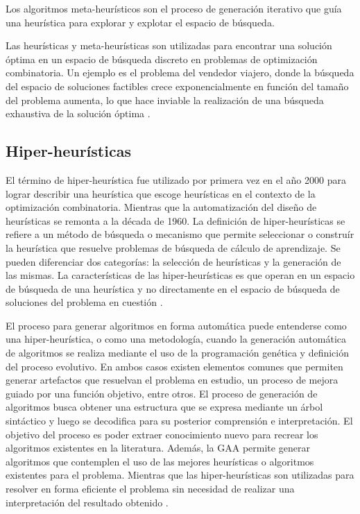 Los algoritmos meta-heurísticos son el proceso de generación iterativo que guía una heurística para explorar y explotar el espacio de búsqueda.

Las heurísticas y meta-heurísticas son utilizadas para encontrar una solución óptima en un espacio de búsqueda discreto en problemas de optimización combinatoria. Un ejemplo es el problema del vendedor viajero, donde la búsqueda del espacio de soluciones factibles crece exponencialmente en función del tamaño del problema aumenta, lo que hace inviable la realización de una búsqueda exhaustiva de la solución óptima \citep{desale_2015}.


\subsection{Hiper-heurísticas}

El término de hiper-heurística fue utilizado por primera vez en el año 2000 para lograr describir una heurística que escoge heurísticas en el contexto de la optimización combinatoria. Mientras que la automatización del diseño de heurísticas se remonta a la década de 1960. La definición de hiper-heurísticas  se refiere a un método de búsqueda o mecanismo que permite seleccionar o construír la heurística que resuelve problemas de búsqueda de cálculo de aprendizaje. Se pueden diferenciar dos categorías: la selección de heurísticas y la generación de las mismas. La características de las hiper-heurísticas es que operan en un espacio de búsqueda de una heurística y no directamente en el espacio de búsqueda de soluciones del problema en cuestión \citep{burke_2013}.

El proceso para generar algoritmos en forma automática puede entenderse como una hiper-heurística, o como una metodología, cuando la generación automática de algoritmos se realiza mediante el uso de la programación genética y definición del proceso evolutivo. En ambos casos existen elementos comunes que permiten generar artefactos que resuelvan el problema en estudio, un proceso de mejora guiado por una función objetivo, entre otros. El proceso de generación de algoritmos busca obtener una estructura que se expresa mediante un árbol sintáctico y luego se decodifica para su posterior comprensión e interpretación. El objetivo del proceso es poder extraer conocimiento nuevo para recrear los algoritmos existentes en la literatura. Además, la GAA permite generar algoritmos que contemplen el uso de las mejores heurísticas o algoritmos existentes para el problema. Mientras que las hiper-heurísticas son utilizadas para resolver en forma eficiente el problema sin necesidad de realizar una interpretación del resultado obtenido \citep{burke_2013}.

